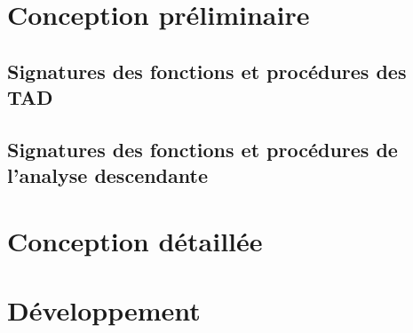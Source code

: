 \documentclass[a4paper]{article}
\begin{document}
	\newpage
	\section{Conception préliminaire}
		\subsection{Signatures des fonctions et procédures des TAD}
			
			
			
			

		\subsection{Signatures des fonctions et procédures de l'analyse descendante}
			

	\newpage
	\section{Conception détaillée}
		
		
		

	\newpage
	\section{Développement}
		
\end{document}

